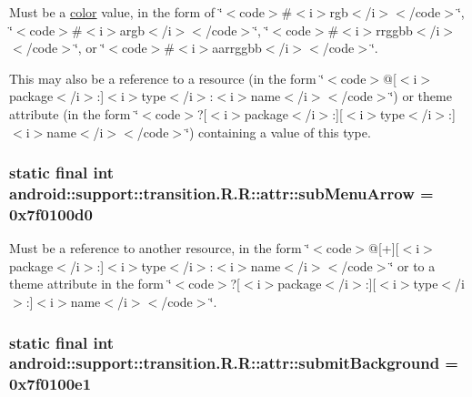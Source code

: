 Must be a \hyperlink{classandroid_1_1support_1_1transition_1_1_r_1_1color}{color} value, in the form of \char`\"{}$<$code$>$\#$<$i$>$rgb$<$/i$>$$<$/code$>$\char`\"{}, \char`\"{}$<$code$>$\#$<$i$>$argb$<$/i$>$$<$/code$>$\char`\"{}, \char`\"{}$<$code$>$\#$<$i$>$rrggbb$<$/i$>$$<$/code$>$\char`\"{}, or \char`\"{}$<$code$>$\#$<$i$>$aarrggbb$<$/i$>$$<$/code$>$\char`\"{}. 

This may also be a reference to a resource (in the form \char`\"{}$<$code$>$@\mbox{[}$<$i$>$package$<$/i$>$:\mbox{]}$<$i$>$type$<$/i$>$:$<$i$>$name$<$/i$>$$<$/code$>$\char`\"{}) or theme attribute (in the form \char`\"{}$<$code$>$?\mbox{[}$<$i$>$package$<$/i$>$:\mbox{]}\mbox{[}$<$i$>$type$<$/i$>$:\mbox{]}$<$i$>$name$<$/i$>$$<$/code$>$\char`\"{}) containing a value of this type. \hypertarget{classandroid_1_1support_1_1transition_1_1_r_1_1attr_e83799b5dad1ee40cb863535c99423b5}{
\subsubsection[{subMenuArrow}]{\setlength{\rightskip}{0pt plus 5cm}static final int android::support::transition.R.R::attr::subMenuArrow = 0x7f0100d0}}
\label{classandroid_1_1support_1_1transition_1_1_r_1_1attr_e83799b5dad1ee40cb863535c99423b5}


Must be a reference to another resource, in the form \char`\"{}$<$code$>$@\mbox{[}+\mbox{]}\mbox{[}$<$i$>$package$<$/i$>$:\mbox{]}$<$i$>$type$<$/i$>$:$<$i$>$name$<$/i$>$$<$/code$>$\char`\"{} or to a theme attribute in the form \char`\"{}$<$code$>$?\mbox{[}$<$i$>$package$<$/i$>$:\mbox{]}\mbox{[}$<$i$>$type$<$/i$>$:\mbox{]}$<$i$>$name$<$/i$>$$<$/code$>$\char`\"{}. \hypertarget{classandroid_1_1support_1_1transition_1_1_r_1_1attr_bbc46245ee60f62831a705edeed27f6d}{
\subsubsection[{submitBackground}]{\setlength{\rightskip}{0pt plus 5cm}static final int android::support::transition.R.R::attr::submitBackground = 0x7f0100e1}}
\label{classandroid_1_1support_1_1transition_1_1_r_1_1attr_bbc46245ee60f62831a705edeed27f6d}


